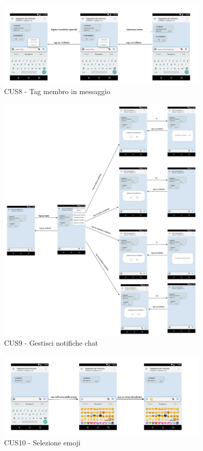 \begin{figure}
	\centering
	\includegraphics[width=0.9\textwidth]{imgs/gruppo6/activities/act_cus8_tag_membro_messaggio.pdf}
	\caption{CUS8 - Tag membro in messaggio}
	\label{fig:act-cus8}
\end{figure}

\begin{figure}
	\centering
	\includegraphics[width=0.9\textwidth]{imgs/gruppo6/activities/act_cus9_gestisci_notifiche_chat.pdf}
	\caption{CUS9 - Gestisci notifiche chat}
	\label{fig:act-cus9}
\end{figure}

\begin{figure}
	\centering
	\includegraphics[width=0.9\textwidth]{imgs/gruppo6/activities/act_cus10_seleziona_emoji.pdf}
	\caption{CUS10 - Selezione emoji}
	\label{fig:act-cus10}
\end{figure}

